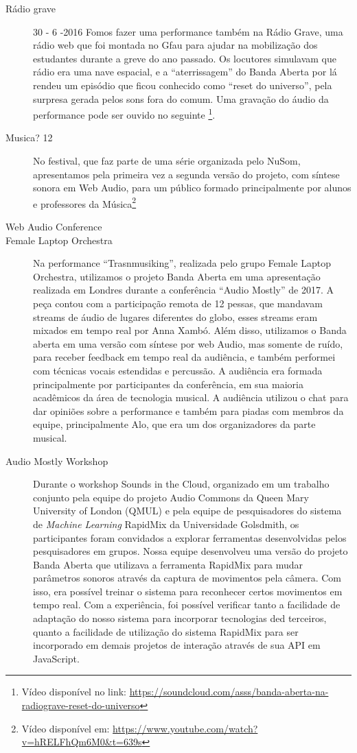 \begin{description}
\item[Rádio grave] 30 - 6 -2016
Fomos fazer uma performance também na Rádio Grave, uma rádio web que foi montada no Gfau para ajudar na mobilização dos  estudantes durante a greve do ano passado. Os locutores simulavam que rádio era uma nave espacial, e a ``aterrissagem'' do Banda Aberta por lá rendeu um episódio que ficou conhecido como ``reset do universo'', pela surpresa gerada pelos sons fora do comum. Uma gravação do áudio da performance pode ser ouvido no seguinte \footnote{Vídeo disponível no link: \url{https://soundcloud.com/asss/banda-aberta-na-radiograve-reset-do-universo}}.


\item[Musica? 12]
No festival, que faz parte de uma série organizada pelo NuSom, apresentamos pela primeira vez a segunda versão do projeto, com síntese sonora em Web Audio, para um público formado principalmente por alunos e professores da Música\footnote{Vídeo disponível em: \url{https://www.youtube.com/watch?v=hRELFhQm6M0&t=639s}}


\item[Web Audio Conference] 


\item[Female Laptop Orchestra]
Na performance ``Trasnmusiking'', realizada pelo grupo Female Laptop Orchestra, utilizamos o projeto Banda Aberta em uma apresentação realizada em Londres durante a conferência ``Audio Mostly'' de 2017. A peça contou com a participação remota de 12 pessas, que mandavam streams de áudio de lugares diferentes do globo, esses streams eram mixados em tempo real por Anna Xambó. Além disso, utilizamos o Banda aberta em uma versão com síntese por web Audio, mas somente de ruído, para receber feedback em tempo real da audiência, e também performei com técnicas vocais estendidas e percussão. A audiência era formada principalmente por participantes da conferência, em sua maioria acadêmicos da área de tecnologia musical. A audiência utilizou o chat para dar opiniões sobre a performance e também para piadas com membros da equipe, principalmente Alo, que era um dos organizadores da parte musical.


\item[Audio Mostly Workshop]
Durante o workshop Sounds in the Cloud, organizado em um trabalho conjunto pela equipe do projeto Audio Commons da Queen Mary University of London (QMUL) e pela equipe de pesquisadores do sistema de \emph{Machine Learning} RapidMix da Universidade Golsdmith, os participantes foram convidados a explorar ferramentas desenvolvidas pelos pesquisadores em grupos. Nossa equipe desenvolveu uma versão do projeto Banda Aberta que utilizava a ferramenta RapidMix para mudar parâmetros sonoros através da captura de movimentos pela câmera. Com isso, era possível treinar o sistema para reconhecer certos movimentos em tempo real. Com a experiência, foi possível verificar tanto a facilidade de adaptação do nosso sistema para incorporar tecnologias ded terceiros, quanto a facilidade de utilização do sistema RapidMix para ser incorporado em demais projetos de interação através de sua API em JavaScript.


\end{description}
